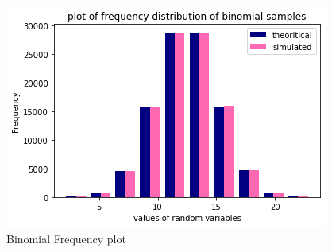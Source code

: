 \documentclass[journal,12pt,twocolumn]{IEEEtran}
\begin{document}
\begin{figure}[!ht]
\centering
\includegraphics[width=\columnwidth]{plot_binomial.png}
\caption{Binomial Frequency plot}
\label{fig:binomial plot}
\end{figure}
\end{document}
